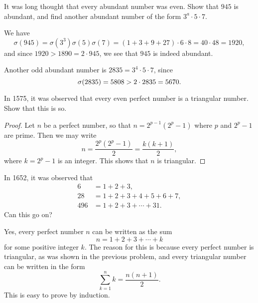  It was long thought that every abundant number was
even. Show that $945$ is abundant, and find another abundant number of
the form $3^a\cdot5\cdot7$.
\begin{solution}
  We have
  \begin{equation*}
    \sigma(945)
    = \sigma(3^3)\sigma(5)\sigma(7)
    = (1 + 3 + 9 + 27)\cdot6\cdot8
    = 40\cdot48
    = 1920,
  \end{equation*}
  and since $1920 > 1890 = 2\cdot945$, we see that $945$ is indeed
  abundant.

  Another odd abundant number is $2835 = 3^4\cdot5\cdot7$, since
  \begin{equation*}
    \sigma(2835) = 5808 > 2\cdot2835 = 5670. \qedhere
  \end{equation*}
\end{solution}

 In 1575, it was observed that every even perfect number is a
triangular number. Show that this is so.
\begin{proof}
  Let $n$ be a perfect number, so that $n = 2^{p-1}(2^p - 1)$ where
  $p$ and $2^p-1$ are prime. Then we may write
  \begin{equation*}
    n = \frac{2^p(2^p - 1)}2 = \frac{k(k + 1)}2,
  \end{equation*}
  where $k = 2^p - 1$ is an integer. This shows that $n$ is triangular.
\end{proof}

 In 1652, it was observed that
\begin{align*}
  6 &= 1 + 2 + 3, \\
  28 &= 1 + 2 + 3 + 4 + 5 + 6 + 7, \\
  496 &= 1 + 2 + 3 + \cdots + 31.
\end{align*}
Can this go on?
\begin{solution}
  Yes, every perfect number $n$ can be written as the sum
  \begin{equation*}
    n = 1 + 2 + 3 + \cdots + k
  \end{equation*}
  for some positive integer $k$. The reason for this is because every
  perfect number is triangular, as was shown in the previous problem,
  and every triangular number can be written in the form
  \begin{equation*}
    \sum_{k=1}^nk = \frac{n(n+1)}2.
  \end{equation*}
  This is easy to prove by induction.
\end{solution}

